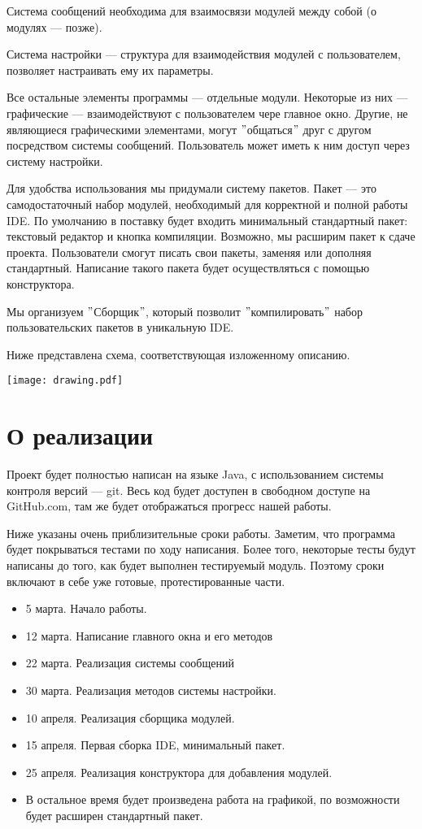 \documentclass[12pt]{article}
\begin{document}
Система сообщений необходима для взаимосвязи модулей между собой (о модулях --- позже). 

Система настройки --- структура для взаимодействия модулей с пользователем, позволяет настраивать ему их параметры.

Все остальные элементы программы --- отдельные модули. Некоторые из них --- графические --- взаимодействуют с пользователем чере главное окно. Другие, не являющиеся графическими элементами, могут $"$общаться$"$ друг с другом посредством системы сообщений. Пользователь может иметь к ним доступ через систему настройки. 

Для удобства использования мы придумали систему пакетов. Пакет --- это самодостаточный набор модулей, необходимый для корректной и полной работы IDE. По умолчанию в поставку будет входить минимальный стандартный пакет: текстовый редактор и кнопка компиляции. Возможно, мы расширим пакет к сдаче проекта. Пользователи смогут писать свои пакеты, заменяя или дополняя стандартный. Написание такого пакета будет осуществляться с помощью конструктора.

Мы организуем $"$Сборщик$"$, который позволит $"$компилировать$"$  набор пользовательских пакетов в уникальную IDE. 

Ниже представлена схема, соответствующая изложенному описанию.


\texttt{[image: drawing.pdf]}

\section{О реализации}

Проект будет полностью написан на языке Java, с использованием системы контроля версий --- git. Весь код будет доступен в свободном доступе на GitHub.com, там же будет отображаться прогресс нашей работы.

Ниже указаны очень приблизительные сроки работы. Заметим, что программа будет покрываться тестами по ходу написания. Более того, некоторые тесты будут написаны до того, как будет выполнен тестируемый модуль. Поэтому сроки включают в себе уже готовые, протестированные части.
\begin{itemize}
\item 5 марта. Начало работы.
\item 12 марта. Написание главного окна и его методов 
\item 22 марта. Реализация системы сообщений
\item 30 марта. Реализация методов системы настройки.
\item 10 апреля. Реализация сборщика модулей.
\item 15 апреля. Первая сборка IDE, минимальный пакет.
\item 25 апреля. Реализация конструктора для добавления модулей.
\item В остальное время будет произведена работа на графикой, по возможности будет расширен стандартный пакет.
\end{itemize}
\end{document}
